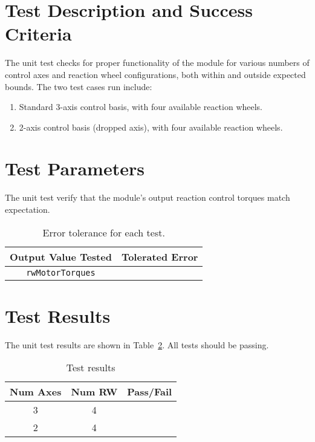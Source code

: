 
\section{Test Description and Success Criteria}
The unit test checks for proper functionality of the module for various numbers of control axes and reaction wheel configurations, both within and outside expected bounds. The two test cases run include:
\begin{enumerate}
\item Standard 3-axis control basis, with four available reaction wheels. 
\item 2-axis control basis (dropped axis), with four available reaction wheels. 

\end{enumerate}


\section{Test Parameters}

The unit test verify that the module's output reaction control torques match expectation.
\begin{table}[htbp]
	\caption{Error tolerance for each test.}
	\label{tab:errortol}
	\centering \fontsize{10}{10}\selectfont
	\begin{tabular}{ c | c } %
		\hline\hline
		\textbf{Output Value Tested}  & \textbf{Tolerated Error}  \\ 
		\hline
		{\tt rwMotorTorques}        & 	   \\ 
		\hline\hline
	\end{tabular}
\end{table}




\section{Test Results}
The unit test results are shown in Table~\ref{tab:results}.  All tests should be passing.
\begin{table}[H]
	\caption{Test results}
	\label{tab:results}
	\centering \fontsize{10}{10}\selectfont
	\begin{tabular}{c | c | c  } %
		\hline\hline
		\textbf{Num Axes} 		& \textbf{Num RW}				  		&\textbf{Pass/Fail} \\ 
		\hline
	   3	   			& 4 & \\ 
	   2	   			& 4 & \\ 
	   
	   \hline\hline
	\end{tabular}
\end{table}








